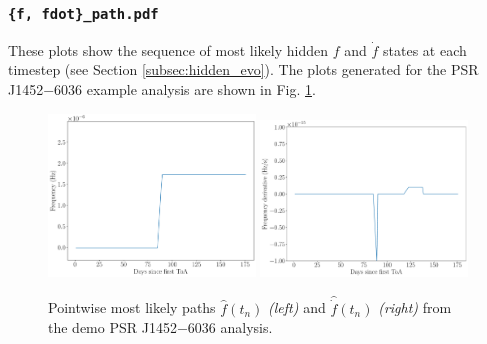 \documentclass{article}
\begin{document}
\subsubsection{\texttt{\{f, fdot\}\_path.pdf}}
These plots show the sequence of most likely hidden $f$ and $\dot{f}$ states at each timestep (see Section \ref{subsec:hidden_evo}).
The plots generated for the PSR J1452$-$6036 example analysis are shown in Fig. \ref{fig:eg_paths}.
\begin{figure}
    \centering
    \includegraphics[width=0.49\textwidth]{figures/J1452-6036_f_path.pdf}
    \includegraphics[width=0.49\textwidth]{figures/J1452-6036_fdot_path.pdf}
    \caption{Pointwise most likely paths $\hat{f}(t_n)$ \emph{(left)} and $\hat{\dot{f}}(t_n)$ \emph{(right)} from the demo PSR J1452$-$6036 analysis.}
    \label{fig:eg_paths}
\end{figure}
\end{document}
